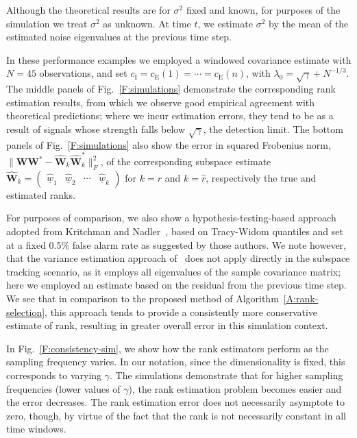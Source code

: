 \documentclass[final]{IEEEtran} %
\newcommand{\vectorsymbol}{\underline}
\newcommand{\matrixsymbol}{\boldsymbol}
\newcommand{\mW}{\matrixsymbol{W}}
\newcommand{\mhW}{\widehat{\matrixsymbol{W}}}
\newcommand{\vhw}{\hat{\vectorsymbol{w}}}
\newcommand{\ce}{c_\text{E}}
\newcommand{\ci}{c_\text{I}}
\begin{document}
Although the theoretical results are for $\sigma^2$ fixed and known, for purposes of the simulation we treat $\sigma^2$ as unknown.  At time $t$, we estimate $\sigma^2$ by the mean of the estimated noise eigenvalues at the previous time step.

In these performance examples we employed a windowed covariance estimate with $N = 45$ observations, and set $\ci = \ce(1) = \cdots = \ce(n)$, with $\lambda_0 = \sqrt{\gamma} + N^{-1/3}$.  The middle panels of Fig.~\ref{F:simulations} demonstrate the corresponding rank estimation results, from which we observe good empirical agreement with theoretical predictions; where we incur estimation errors, they tend to be as a result of signals whose strength falls below $\sqrt{\gamma}$, the detection limit.  The bottom panels of Fig.~\ref{F:simulations} also show the error in squared Frobenius norm, $\| \mW \mW^\ast - \mhW_k \mhW^\ast_k \|_F^2$, of the corresponding subspace estimate
\(
    \mhW_k
    =
    \begin{pmatrix}
        \vhw_1 & \vhw_2 & \cdots & \vhw_k
    \end{pmatrix}
\)
for $k = r$ and $k = \hat r$, respectively the true and estimated ranks.

For purposes of comparison, we also show a hypothesis-testing-based approach adopted from Kritchman and Nadler~\cite{kritchman2008dnc}, based on Tracy-Widom quantiles and set at a fixed 0.5\% false alarm rate as suggested by those authors.  We note however, that the variance estimation approach of~\cite{kritchman2008dnc} does not apply directly in the subspace tracking scenario, as it employs all eigenvalues of the sample covariance matrix; here we employed an estimate based on the residual from the previous time step.  We see that in comparison to the proposed method of Algorithm~\ref{A:rank-selection}, this approach tends to provide a consistently more conservative estimate of rank, resulting in greater overall error in this simulation context.

In Fig.~\ref{F:consistency-sim}, we show how the rank estimators perform as the sampling frequency varies.  In our notation, since the dimensionality is fixed, this corresponds to varying $\gamma$.  The simulations demonstrate that for higher sampling frequencies (lower values of $\gamma$), the rank estimation problem becomes easier and the error decreases.  The rank estimation error does not necessarily asymptote to zero, though, by virtue of the fact that the rank is not necessarily constant in all time windows.
\end{document}
